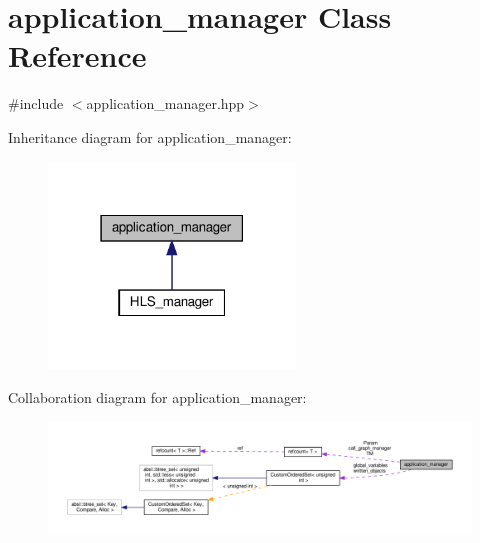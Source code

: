 \hypertarget{classapplication__manager}{}\section{application\+\_\+manager Class Reference}
\label{classapplication__manager}


{\ttfamily \#include $<$application\+\_\+manager.\+hpp$>$}



Inheritance diagram for application\+\_\+manager\+:
\nopagebreak
\begin{figure}[H]
\begin{center}
\leavevmode
\includegraphics[width=186pt]{df/de9/classapplication__manager__inherit__graph}
\end{center}
\end{figure}


Collaboration diagram for application\+\_\+manager\+:
\nopagebreak
\begin{figure}[H]
\begin{center}
\leavevmode
\includegraphics[width=350pt]{d6/d85/classapplication__manager__coll__graph}
\end{center}
\end{figure}
